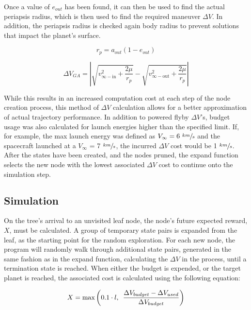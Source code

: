 \documentclass[letterpaper, preprint, paper,11pt]{AAS}	%
\begin{document}
Once a value of $e_{out}$ has been found, it can then be used to find the actual periapsis radius, which is then used to find the required maneuver $\Delta V$. In addition, the periapsis radius is checked again body radius to prevent solutions that impact the planet's surface.

\begin{equation}
    r_p = a_{out}(1 - e_{out})
\end{equation}

\begin{equation}
    \Delta V_{GA} = \left| \sqrt{ v^2_{\infty-\text{in}} + \frac{2\mu}{r_p} } - \sqrt{ v^2_{\infty-\text{out}} + \frac{2\mu}{r_p} } \right|
\end{equation}

While this results in an increased computation cost at each step of the node creation process, this method of $\Delta V$ calculation allows for a better approximation of actual trajectory performance. In addition to powered flyby $\Delta V$'s, budget usage was also calculated for launch energies higher than the specified limit. If, for example, the max launch energy was defined as $V_\infty = 6 \text{ }\sfrac{km}{s}$ and the spacecraft launched at a $V_\infty$ = 7 $\sfrac{km}{s}$, the incurred $\Delta V$ cost would be 1 $\sfrac{km}{s}$. After the states have been created, and the nodes pruned, the expand function selects the new node with the lowest associated $\Delta V$ cost to continue onto the simulation step.

\subsection{Simulation}

On the tree's arrival to an unvisited leaf node, the node's future expected reward, $X$, must be calculated. A group of temporary state pairs is expanded from the leaf, as the starting point for the random exploration. For each new node, the program will randomly walk through additional state pairs, generated in the same fashion as in the expand function, calculating the $\Delta V$ in the process, until a termination state is reached. When either the budget is expended, or the target planet is reached, the associated cost is calculated using the following equation:

\begin{equation}
    \label{eq:simCost1}
    X = \text{max}\left( 0.1 \cdot l,\hspace{0.5em} \frac{\Delta V_{budget} - \Delta V_{used}}{\Delta V_{budget}} \right)
\end{equation}
\end{document}

